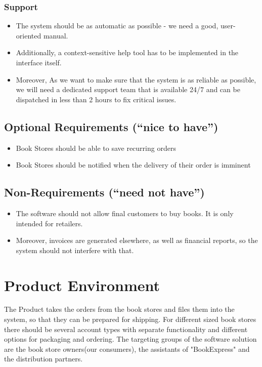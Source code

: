 \documentclass[11pt,a4paper,oneside,svgnames]{report}
\begin{document}
\subsection{Support}
\begin{itemize}
\item The system should be as automatic as possible - we need a good, user-oriented manual.
\item Additionally, a context-sensitive help tool has to be implemented in the interface itself. 
\item Moreover, As we want to make sure that the system is as reliable as possible, we will need a dedicated support team that is available 24/7 and can be dispatched in less than 2 hours to fix critical issues.
\end{itemize}

\section{Optional Requirements (``nice to have'')}
\begin{itemize}
\item Book Stores should be able to save recurring orders
\item Book Stores should be notified when the delivery of their order is imminent\\
\end{itemize}

\section{Non-Requirements (``need not have'')}
\begin{itemize}
\item The software should not allow final customers to buy books. It is only intended for retailers.
\item Moreover, invoices are generated elsewhere, as well as financial reports, so the system should not interfere with that.\\
\end{itemize}
\chapter{Product Environment}
The Product takes the orders from the book stores and files them into the system, so that they can be prepared for shipping. For different sized book stores there should be several account types with separate functionality and different options for packaging and ordering. The targeting groups of the software solution are the book store owners(our consumers), the assistants of "BookExpress" and the distribution partners.
\end{document}
